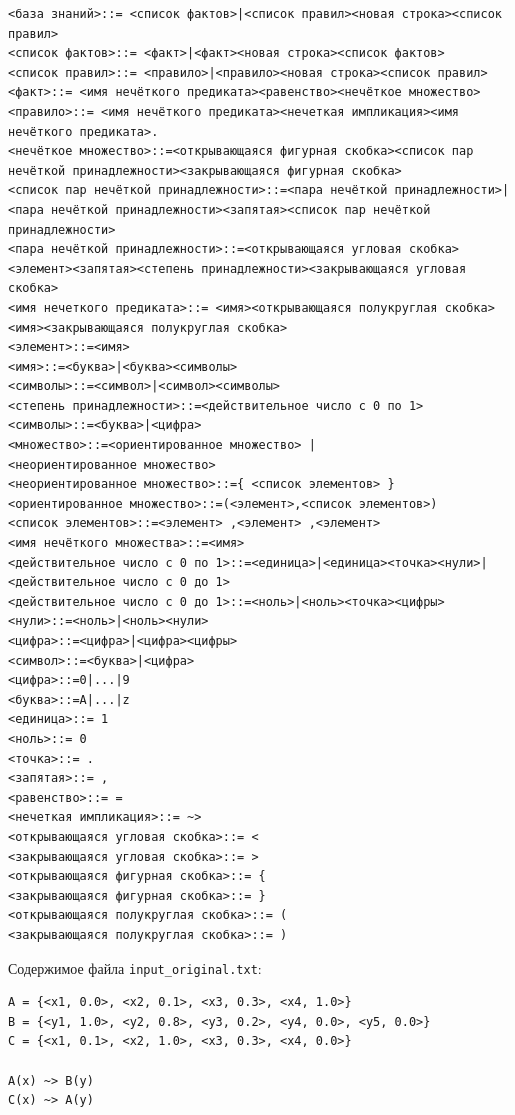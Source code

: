\documentclass[14pt,a4paper]{extarticle}
\begin{document}
\begin{Verbatim}[fontsize=\small,frame=single,breaklines=true]
<база знаний>::= <список фактов>|<список правил><новая строка><список правил>
<список фактов>::= <факт>|<факт><новая строка><список фактов>
<список правил>::= <правило>|<правило><новая строка><список правил>
<факт>::= <имя нечёткого предиката><равенство><нечёткое множество>
<правило>::= <имя нечёткого предиката><нечеткая импликация><имя нечёткого предиката>.
<нечёткое множество>::=<открывающаяся фигурная скобка><список пар нечёткой принадлежности><закрывающаяся фигурная скобка>
<список пар нечёткой принадлежности>::=<пара нечёткой принадлежности>|<пара нечёткой принадлежности><запятая><список пар нечёткой принадлежности>
<пара нечёткой принадлежности>::=<открывающаяся угловая скобка><элемент><запятая><степень принадлежности><закрывающаяся угловая скобка>
<имя нечеткого предиката>::= <имя><открывающаяся полукруглая скобка><имя><закрывающаяся полукруглая скобка>
<элемент>::=<имя>
<имя>::=<буква>|<буква><символы>
<символы>::=<символ>|<символ><символы>
<степень принадлежности>::=<действительное число с 0 по 1>
<символы>::=<буква>|<цифра>
<множество>::=<ориентированное множество> |
<неориентированное множество>
<неориентированное множество>::={ <список элементов> }
<ориентированное множество>::=(<элемент>,<список элементов>)
<список элементов>::=<элемент> ,<элемент> ,<элемент>
<имя нечёткого множества>::=<имя>
<действительное число с 0 по 1>::=<единица>|<единица><точка><нули>|<действительное число с 0 до 1>
<действительное число с 0 до 1>::=<ноль>|<ноль><точка><цифры>
<нули>::=<ноль>|<ноль><нули>
<цифра>::=<цифра>|<цифра><цифры>
<символ>::=<буква>|<цифра>
<цифра>::=0|...|9
<буква>::=A|...|z
<единица>::= 1
<ноль>::= 0
<точка>::= .
<запятая>::= ,
<равенство>::= =
<нечеткая импликация>::= ~>
<открывающаяся угловая скобка>::= <
<закрывающаяся угловая скобка>::= >
<открывающаяся фигурная скобка>::= {
<закрывающаяся фигурная скобка>::= }
<открывающаяся полукруглая скобка>::= (
<закрывающаяся полукруглая скобка>::= )
\end{Verbatim}


Содержимое файла \texttt{input\_original.txt}:
\begin{Verbatim}[fontsize=\small,frame=single,breaklines=true]
A = {<x1, 0.0>, <x2, 0.1>, <x3, 0.3>, <x4, 1.0>}
B = {<y1, 1.0>, <y2, 0.8>, <y3, 0.2>, <y4, 0.0>, <y5, 0.0>}
C = {<x1, 0.1>, <x2, 1.0>, <x3, 0.3>, <x4, 0.0>}

A(x) ~> B(y)
C(x) ~> A(y)
\end{Verbatim}
\end{document}
